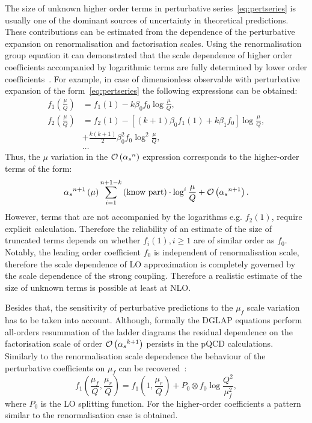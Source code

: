
The size of unknown higher order terms in perturbative series~\ref{eq:pertseries} is usually one of the dominant sources of uncertainty in theoretical predictions. These contributions can be estimated from the dependence of the perturbative expansion on renormalisation and factorisation scales. Using the renormalisation group equation it can demonstrated that the scale dependence of higher order coefficients accompanied by logarithmic terms are fully determined by lower order coefficients~\cite{DataAnalysisBehnke}. For example, in case of dimensionless observable with perturbative expansion of the form~\ref{eq:pertseries} the following expressions can be obtained:
\begin{align}
	f_1\left(\frac{\mu}{Q}\right) &= f_1\left(1\right) - k\beta_0f_0\log{\frac{\mu}{Q}}, \\
	f_2\left(\frac{\mu}{Q}\right) &= f_2\left(1\right) - \left[\left(k+1\right)\beta_0f_1\left(1\right) + k\beta_1f_0\right]\log{\frac{\mu}{Q}}, \\
																						&+ \frac{k\left(k+1\right)}{2}\beta_0^2f_0\log^2{\frac{\mu}{Q}},\\
																						& \ldots 
\end{align}
Thus, the $\mu$ variation in the $\mathcal{O}\left(\mbox{$\alpha_{s}$}^n\right)$ expression corresponds to the higher-order terms of the form:
\begin{equation}
 \mbox{$\alpha_{s}$}^{n+1}\left(\mu\right) \sum_{i=1}^{n+1-k}{\text{(know part)}\cdot\log^i{\frac{\mu}{Q}}} + \mathcal{O}\left(\mbox{$\alpha_{s}$}^{n+1}\right).
\label{eq:scalevariationerror}
\end{equation}
However, terms that are not accompanied by the logarithms e.g. $f_2\left(1\right)$, require explicit calculation. Therefore the reliability of an estimate of the size of truncated terms depends on whether $f_i\left(1\right), i \ge 1$ are of similar order as $f_0$. Notably,
the leading order coefficient $f_0$ is independent of renormalisation scale, therefore the scale dependence of LO approximation is completely governed by the scale dependence of the strong coupling. Therefore a realistic estimate of the size of unknown terms is possible at least at NLO.

Besides that, the sensitivity of perturbative predictions to the $\mu_f$ scale variation has to be taken into account. Although, formally the DGLAP equations perform all-orders resummation of the ladder diagrams the residual dependence on the factorisation scale of order $\mathcal{O}\left(\mbox{$\alpha_{s}$}^{k+1}\right)$ persists in the pQCD calculations. Similarly to the renormalisation scale dependence the behaviour of the perturbative coefficients on $\mu_f$ can be recovered~\cite{markusdiehl}:
\begin{equation}
 f_1\left(\frac{\mu_f}{Q},\frac{\mu_r}{Q}\right) = f_1\left(1,\frac{\mu_r}{Q}\right) + P_0 \otimes f_0 \log{\frac{Q^2}{\mu_f^2}},
\label{eq:factorisationscaledep}
\end{equation}
where $P_0$ is the LO splitting function. For the higher-order coefficients a pattern similar to the renormalisation case is obtained.

